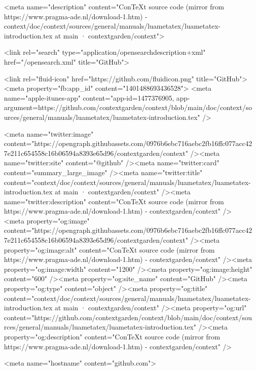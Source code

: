     

      <meta name="description" content="ConTeXt source code (mirror from https://www.pragma-ade.nl/download-1.htm) - context/doc/context/sources/general/manuals/luametatex/luametatex-introduction.tex at main · contextgarden/context">

      <link rel="search" type="application/opensearchdescription+xml" href="/opensearch.xml" title="GitHub">

    <link rel="fluid-icon" href="https://github.com/fluidicon.png" title="GitHub">
    <meta property="fb:app_id" content="1401488693436528">
    <meta name="apple-itunes-app" content="app-id=1477376905, app-argument=https://github.com/contextgarden/context/blob/main/doc/context/sources/general/manuals/luametatex/luametatex-introduction.tex" />

      <meta name="twitter:image" content="https://opengraph.githubassets.com/0976b6ebc716aebc2fb16ffc077acc427e211c654558c16b06594a8393e65d96/contextgarden/context" /><meta name="twitter:site" content="@github" /><meta name="twitter:card" content="summary_large_image" /><meta name="twitter:title" content="context/doc/context/sources/general/manuals/luametatex/luametatex-introduction.tex at main · contextgarden/context" /><meta name="twitter:description" content="ConTeXt source code (mirror from https://www.pragma-ade.nl/download-1.htm) - contextgarden/context" />
  <meta property="og:image" content="https://opengraph.githubassets.com/0976b6ebc716aebc2fb16ffc077acc427e211c654558c16b06594a8393e65d96/contextgarden/context" /><meta property="og:image:alt" content="ConTeXt source code (mirror from https://www.pragma-ade.nl/download-1.htm) - contextgarden/context" /><meta property="og:image:width" content="1200" /><meta property="og:image:height" content="600" /><meta property="og:site_name" content="GitHub" /><meta property="og:type" content="object" /><meta property="og:title" content="context/doc/context/sources/general/manuals/luametatex/luametatex-introduction.tex at main · contextgarden/context" /><meta property="og:url" content="https://github.com/contextgarden/context/blob/main/doc/context/sources/general/manuals/luametatex/luametatex-introduction.tex" /><meta property="og:description" content="ConTeXt source code (mirror from https://www.pragma-ade.nl/download-1.htm) - contextgarden/context" />
  




      <meta name="hostname" content="github.com">



